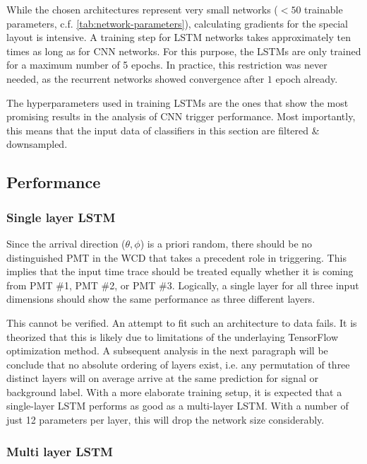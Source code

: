 While the chosen architectures represent very small networks ($<50$ trainable parameters, c.f. \autoref{tab:network-parameters}), calculating gradients for the 
special layout is intensive. A training step for LSTM networks takes approximately ten times as long as for CNN networks. For this purpose, the LSTMs are only 
trained for a maximum number of 5 epochs. In practice, this restriction was never needed, as the recurrent networks showed convergence after $1$ epoch already.

The hyperparameters used in training LSTMs are the ones that show the most promising results in the analysis of CNN trigger performance. Most importantly, this 
means that the input data of classifiers in this section are filtered \& downsampled.

\subsection{Performance}
\label{ssec:cnn-charge-cut}

\subsubsection{Single layer LSTM}
\label{sssec:single-layer-lsmt}

Since the arrival direction ($\theta, \phi$) is a priori random, there should be no distinguished PMT in the WCD that takes a precedent role in triggering. This 
implies that the input time trace should be treated equally whether it is coming from PMT \#1, PMT \#2, or PMT \#3. Logically, a single layer for all three input
dimensions should show the same performance as three different layers. 

This cannot be verified. An attempt to fit such an architecture to data fails. It is theorized that this is likely due to limitations of the underlaying TensorFlow 
optimization method. A subsequent analysis in the next paragraph will be conclude that no absolute ordering of layers exist, i.e. any permutation of three distinct
layers will on average arrive at the same prediction for signal or background label. With a more elaborate training setup, it is expected that a single-layer LSTM 
performs as good as a multi-layer LSTM. With a number of just 12 parameters per layer, this will drop the network size considerably.

\subsubsection{Multi layer LSTM}
\label{sssec:multi-layer-lsmt}

